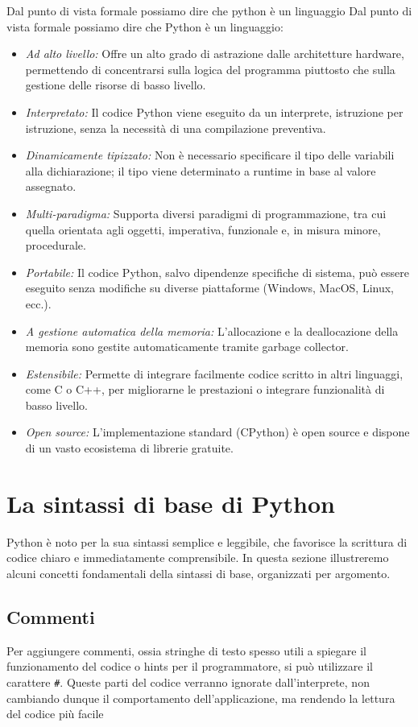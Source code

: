 Dal punto di vista formale possiamo dire che python è un linguaggio
Dal punto di vista formale possiamo dire che Python è un linguaggio:
\begin{itemize}
	\item \textit{Ad alto livello:}
	      Offre un alto grado di astrazione dalle architetture hardware, permettendo di concentrarsi sulla logica del programma piuttosto che sulla gestione delle risorse di basso livello.
	\item \textit{Interpretato:}
	      Il codice Python viene eseguito da un interprete, istruzione per istruzione, senza la necessità di una compilazione preventiva.
	\item \textit{Dinamicamente tipizzato:}
	      Non è necessario specificare il tipo delle variabili alla dichiarazione; il tipo viene determinato a runtime in base al valore assegnato.
	\item \textit{Multi-paradigma:}
	      Supporta diversi paradigmi di programmazione, tra cui quella orientata agli oggetti, imperativa, funzionale e, in misura minore, procedurale.
	\item \textit{Portabile:}
	      Il codice Python, salvo dipendenze specifiche di sistema, può essere eseguito senza modifiche su diverse piattaforme (Windows, MacOS, Linux, ecc.).
	\item \textit{A gestione automatica della memoria:}
	      L'allocazione e la deallocazione della memoria sono gestite automaticamente tramite garbage collector.
	\item \textit{Estensibile:}
	      Permette di integrare facilmente codice scritto in altri linguaggi, come C o C++, per migliorarne le prestazioni o integrare funzionalità di basso livello.
	\item \textit{Open source:}
	      L’implementazione standard (CPython) è open source e dispone di un vasto ecosistema di librerie gratuite.
\end{itemize}

\section{La sintassi di base di Python}

Python è noto per la sua sintassi semplice e leggibile, che favorisce la scrittura di codice chiaro e immediatamente comprensibile. In questa sezione illustreremo alcuni concetti fondamentali della sintassi di base, organizzati per argomento.

\subsection{Commenti}
Per aggiungere commenti, ossia stringhe di testo spesso utili a spiegare il funzionamento del codice o hints per il programmatore, si può utilizzare il carattere \verb|#|. Queste parti del codice verranno ignorate dall'interprete, non cambiando dunque il comportamento dell'applicazione, ma rendendo la lettura del codice più facile

